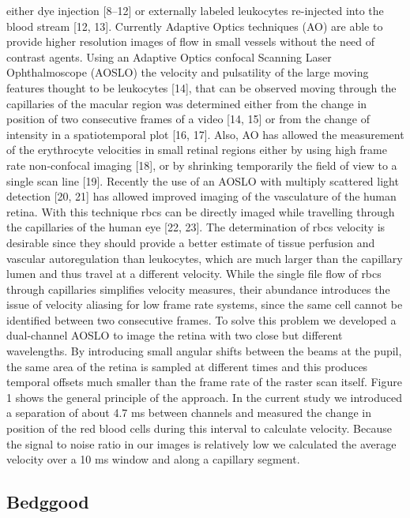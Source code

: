 \documentclass[]{article}
\begin{document}
either dye injection [8–12] or externally labeled leukocytes re-injected into the blood stream [12, 13]. Currently Adaptive Optics techniques (AO) are able to provide higher resolution images of flow in small vessels without the need of contrast agents. Using an Adaptive Optics confocal Scanning Laser Ophthalmoscope (AOSLO) the velocity and pulsatility of the large moving features thought to be leukocytes [14], that can be observed moving through the capillaries of the macular region was determined either from the change in position of two consecutive frames of a video [14, 15] or from the change of intensity in a spatiotemporal plot [16, 17]. Also, AO has allowed the measurement of the erythrocyte velocities in small retinal regions either by using high frame rate non-confocal imaging [18], or by shrinking temporarily the field of view to a single scan line [19].
Recently the use of an AOSLO with multiply scattered light detection [20, 21] has allowed improved imaging of the vasculature of the human retina. With this technique rbcs can be directly imaged while travelling through the capillaries of the human eye [22, 23]. The determination of rbcs velocity is desirable since they should provide a better estimate of tissue perfusion and vascular autoregulation than leukocytes, which are much larger than the capillary lumen and thus travel at a different velocity. While the single file flow of rbcs through capillaries simplifies velocity measures, their abundance introduces the issue of velocity aliasing for low frame rate systems, since the same cell cannot be identified between two consecutive frames. To solve this problem we developed a dual-channel AOSLO to image the retina with two close but different wavelengths. By introducing small angular shifts between the beams at the pupil, the same area of the retina is sampled at different times and this produces temporal offsets much smaller than the frame rate of the raster scan itself. Figure 1 shows the general principle of the approach. In the current study we introduced a separation of about 4.7 ms between channels and measured the change in position of the red blood cells during this interval to calculate velocity. Because the signal to noise ratio in our images is relatively low we calculated the average velocity over a 10 ms window and along a capillary segment.

\subsection{Bedggood}
\end{document}
